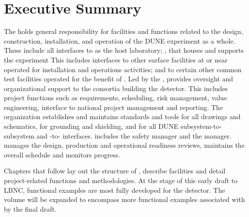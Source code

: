 \chapter{Executive Summary}
\label{vl:tc-execsum}


The   holds general responsibility for
facilities and functions related to the design, construction,
installation, and operation of the DUNE experiment as a whole. These
include all interfaces to \fnal as the host laboratory; ,
 that houses and supports the  experiment This
includes interfaces to other surface facilities at or near \surf
operated for installation and operations activities; and to certain
other common test facilities operated for the benefit of
. Led by the  , 
 provides oversight and organizational support to the
consortia building the  detector.  This includes project
functions such as requirements, scheduling, risk management, value
engineering, interface to national project management and
reporting. The  organization establishes and maintains
standards and tools for all drawings and schematics, for grounding and
shielding, and for all DUNE subsystem-to-subsystem and
-to- interfaces.   includes the
 safety manager and the  
manager.   manages the design, production and
operational readiness reviews, maintains the overall schedule and
monitors progress.

Chapters that follow lay out the structure of 
, describe  facilities and detail
project-related functions and methodologies. At the stage of this
early draft to LBNC,   functional examples are most fully
developed for the  detector. The volume will be expanded to
encompass more functional examples associated with 
 by the final draft.

